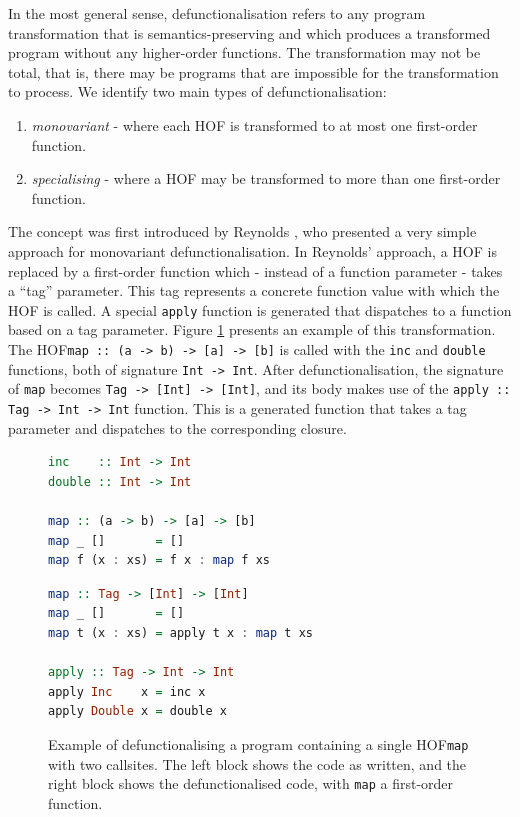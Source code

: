 \documentclass[a4paper,UKenglish,cleveref, autoref, thm-restate]{template/lipics-v2021}
\newcommand{\hof}{HOF\xspace}
\begin{document}
In the most general sense, defunctionalisation refers to any program transformation that is semantics-preserving and which produces a transformed program without any higher-order functions. The transformation may not be total, that is, there may be programs that are impossible for the transformation to process. We identify two main types of defunctionalisation:
\begin{enumerate}[1.]
  \item \textit{monovariant} - where each \hof is transformed to at most one first-order function.
  \item \textit{specialising} - where a \hof may be transformed to more than one first-order function.
\end{enumerate}

The concept was first introduced by Reynolds \cite{reynolds1972definitional}, who presented a very simple approach for monovariant defunctionalisation. In Reynolds' approach, a \hof is replaced by a first-order function which - instead of a function parameter - takes a ``tag'' parameter. This tag represents a concrete function value with which the \hof is called. A special \texttt{apply} function is generated that dispatches to a function based on a tag parameter. Figure \ref{fig:ex-defunc} presents an example of this transformation. The \hof \texttt{map :: (a -> b) -> [a] -> [b]} is called with the \texttt{inc} and \texttt{double} functions, both of signature \texttt{Int -> Int}. After defunctionalisation, the signature of \texttt{map} becomes \texttt{Tag -> [Int] -> [Int]}, and its body makes use of the \texttt{apply :: Tag -> Int -> Int} function. This is a generated function that takes a tag parameter and dispatches to the corresponding closure.



\begin{figure}
  \centering
  \begin{minipage}[t]{0.45\textwidth}
    \begin{lstlisting}[language=Haskell]
inc    :: Int -> Int
double :: Int -> Int

map :: (a -> b) -> [a] -> [b]
map _ []       = []
map f (x : xs) = f x : map f xs\end{lstlisting}
  \end{minipage}
  \hfill
  \begin{minipage}[t]{0.53\textwidth}
    \begin{lstlisting}[language=Haskell]
map :: Tag -> [Int] -> [Int]
map _ []       = []
map t (x : xs) = apply t x : map t xs

apply :: Tag -> Int -> Int
apply Inc    x = inc x
apply Double x = double x\end{lstlisting}
  \end{minipage}
  \caption{Example of defunctionalising a program containing a single \hof \texttt{map} with two callsites. The left block shows the code as written, and the right block shows the defunctionalised code, with \texttt{map} a first-order function.}
  \label{fig:ex-defunc}
\end{figure}
\end{document}
